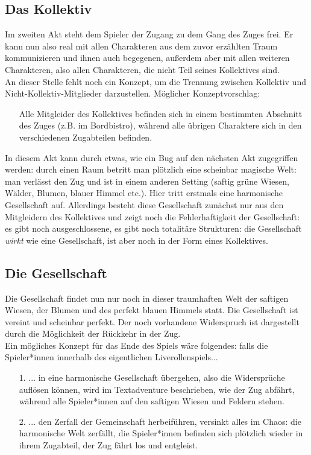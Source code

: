 \documentclass[a4paper, 12pt]{scrartcl}
\begin{document}
    \subsection{Das Kollektiv}
    Im zweiten Akt steht dem Spieler der Zugang zu dem Gang des Zuges frei. 
    Er kann nun also real mit allen Charakteren aus dem zuvor erzählten Traum kommunizieren und ihnen auch begegenen, außerdem aber mit allen weiteren Charakteren, also allen Charakteren, die nicht Teil seines Kollektives sind. \\
    An dieser Stelle fehlt noch ein Konzept, um die Trennung zwischen Kollektiv und Nicht-Kollektiv-Mitglieder darzustellen.
    Möglicher Konzeptvorschlag:
    \begin{itemize}
    \item[] Alle Mitgleider des Kollektives befinden sich in einem bestimmten Abschnitt des Zuges (z.B. im Bordbistro), während alle übrigen Charaktere sich in den verschiedenen Zugabteilen befinden.
    \end{itemize}

    In diesem Akt kann durch etwas, wie ein Bug auf den nächsten Akt zugegriffen werden: 
    durch einen Raum betritt man plötzlich eine scheinbar magische Welt:
    man verlässt den Zug und ist in einem anderen Setting (saftig grüne Wiesen, Wälder, Blumen, blauer Himmel etc.).
    Hier tritt erstmals eine harmonische Gesellschaft auf. 
    Allerdings besteht diese Gesellschaft zunächst nur aus den Mitgleidern des Kollektives und zeigt noch die Fehlerhaftigkeit der Gesellschaft: es gibt noch ausgeschlossene, es gibt noch totalitäre Strukturen: die Gesellschaft \textit{wirkt} wie eine Gesellschaft, ist aber noch in der Form eines Kollektives. 

    \subsection{Die Gesellschaft}
    Die Gesellschaft findet nun nur noch in dieser traumhaften Welt der saftigen Wiesen, der Blumen und des perfekt blauen Himmels statt. 
    Die Gesellschaft ist vereint und scheinbar perfekt. 
    Der noch vorhandene Widerspruch ist dargestellt durch die Möglichkeit der Rückkehr in der Zug.\\
    Ein mögliches Konzept für das Ende des Spiels wäre folgendes: falls die Spieler*innen innerhalb des eigentlichen Liverollenspiels...
    \begin{itemize}
    \item[1.] ... in eine harmonische Gesellschaft übergehen, also die Widersprüche auflösen können, wird im Textadventure beschrieben, wie der Zug abfährt, während alle Spieler*innen auf den saftigen Wiesen und Feldern stehen. 
    \item[2.] ... den Zerfall der Gemeinschaft herbeiführen, versinkt alles im Chaos: die harmonische Welt zerfällt, die Spieler*innen befinden sich plötzlich wieder in ihrem Zugabteil, der Zug fährt los und entgleist.
    \end{itemize}
\end{document}

